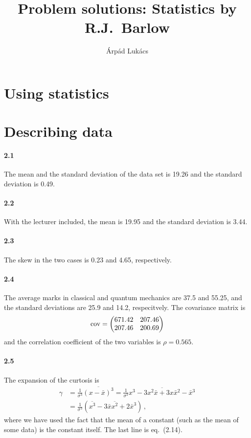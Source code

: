 \documentclass[a4paper,12pt]{article}
\title{Problem solutions: Statistics by R.J.~Barlow}
\author{Árpád Lukács}
\begin{document}
\maketitle

\section{Using statistics}\label{sec:UsingStatistics}

\section{Describing data}\label{sec:DescribingData}

\paragraph{2.1} The mean and the standard deviation of the data set is 19.26 and the standard deviation is 0.49.

\paragraph{2.2} With the lecturer included, the mean is 19.95 and the standard deviation is 3.44.

\paragraph{2.3} The skew in the two cases is 0.23 and 4.65, respectively.

\paragraph{2.4} The average marks in classical and quantum mechanics are 37.5 and 55.25, and the standard deviations are 25.9 and 14.2, respecitvely. The covariance matrix is
\[
 {\rm cov} =
 \begin{pmatrix}
 671.42 & 207.46\\
 207.46 & 200.69
 \end{pmatrix}
\]
and the correlation coefficient of the two variables is $\rho = 0.565$.

\paragraph{2.5} The expansion of the curtosis is
\[
 \begin{aligned}
  \gamma &= \frac{1}{\sigma^3} \overline{(x-\bar{x})^3} = \frac{1}{\sigma^3}\overline{x^3 - 3 x^2\bar{x} + 3 x\bar{x}{}^2 - \bar{x}{}^3}\\
  &= \frac{1}{\sigma^3}(\overline{x^3}-3\bar{x}\overline{x^2} + 2\bar{x}^3)\,,
 \end{aligned}
\]
where we have used the fact that the mean of a constant (such as the mean of some data) is the constant itself. The last line is eq.\ (2.14).
\end{document}
